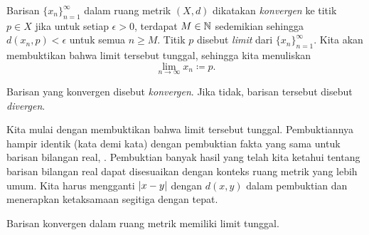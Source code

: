 \begin{defn}
Barisan $\{ x_n \}_{n=1}^\infty$ dalam ruang metrik $(X,d)$ dikatakan
\emph{konvergen} ke titik
$p \in X$ jika untuk setiap $\epsilon > 0$, terdapat $M \in {\mathbb{N}}$ sedemikian
sehingga $d(x_n,p) < \epsilon$ untuk semua $n \geq M$.  Titik $p$
disebut \emph{limit}
dari $\{ x_n \}_{n=1}^\infty$.
Kita akan membuktikan bahwa limit tersebut tunggal, sehingga
kita menuliskan
\begin{equation*}
\lim_{n\to \infty} x_n \coloneqq p .
\end{equation*}

Barisan
yang konvergen disebut \emph{konvergen}.
Jika tidak, barisan tersebut disebut 
\emph{divergen}.
\begin{myfigureht}
\caption{Barisan yang konvergen ke $p$.  Sepuluh titik pertama 
ditampilkan dan $M=7$ untuk $\epsilon$ ini.\label{fig:sequence-convergence-metric}}
\end{myfigureht}
\end{defn}

Kita mulai dengan membuktikan bahwa limit tersebut tunggal.  Pembuktiannya hampir
identik (kata demi kata) dengan pembuktian fakta yang sama untuk barisan
bilangan real,
.
Pembuktian banyak hasil yang telah kita ketahui tentang barisan bilangan real dapat
disesuaikan dengan
konteks ruang metrik yang lebih umum.  Kita harus mengganti $\lvert {x-y} \rvert$
dengan $d(x,y)$ dalam pembuktian dan menerapkan ketaksamaan segitiga dengan tepat.

\begin{prop} \label{prop:mslimisunique}
Barisan konvergen dalam ruang metrik memiliki limit tunggal.
\end{prop}

